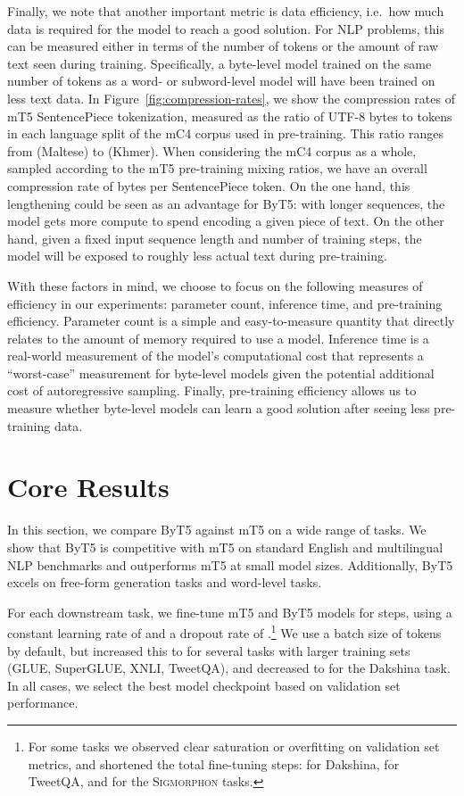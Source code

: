 \documentclass[11pt,a4paper]{article}
\begin{document}
Finally, we note that another important metric is data efficiency, i.e.\ how much data is required for the model to reach a good solution.
For NLP problems, this can be measured either in terms of the number of tokens or the amount of raw text seen during training.
Specifically, a byte-level model trained on the same number of tokens as a word- or subword-level model will have been trained on less text data.
In Figure~\ref{fig:compression-rates}, we show the compression rates of mT5 SentencePiece tokenization, measured as the ratio of UTF-8 bytes to tokens in each language split of the mC4 corpus used in pre-training. This ratio ranges from  (Maltese) to  (Khmer). When considering the mC4 corpus as a whole, sampled according to the mT5 pre-training mixing ratios, we have an overall compression rate of  bytes per SentencePiece token. On the one hand, this  lengthening could be seen as an advantage for ByT5: with longer sequences, the model gets more compute to spend encoding a given piece of text. On the other hand, given a fixed input sequence length and number of training steps, the model will be exposed to roughly  less actual text during pre-training.

With these factors in mind, we choose to focus on the following measures of efficiency in our experiments: parameter count, inference time, and pre-training efficiency.
Parameter count is a simple and easy-to-measure quantity that directly relates to the amount of memory required to use a model.
Inference time is a real-world measurement of the model's computational cost that represents a ``worst-case'' measurement for byte-level models given the potential additional cost of autoregressive sampling.
Finally, pre-training efficiency allows us to measure whether byte-level models can learn a good solution after seeing less pre-training data.

\section{Core Results}
\label{sec:core_results}

In this section, we compare ByT5 against mT5 on a wide range of tasks. We show that ByT5 is competitive with mT5 on standard English and multilingual NLP benchmarks and outperforms mT5 at small model sizes. Additionally, ByT5 excels on free-form generation tasks and word-level tasks.

For each downstream task, we fine-tune mT5 and ByT5 models for  steps, using a constant learning rate of  and a dropout rate of .\footnote{For some tasks we observed clear saturation or overfitting on validation set metrics, and shortened the total fine-tuning steps:  for Dakshina,  for TweetQA, and  for the \textsc{Sigmorphon} tasks.} We use a batch size of  tokens by default, but increased this to  for several tasks with larger training sets (GLUE, SuperGLUE, XNLI, TweetQA), and decreased to  for the Dakshina task. In all cases, we select the best model checkpoint based on validation set performance.
\end{document}
